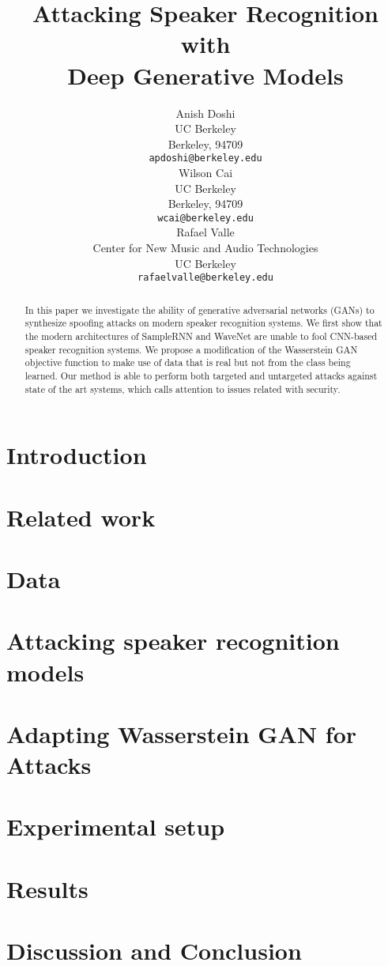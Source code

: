 \documentclass{article}
\title{Attacking Speaker Recognition with \\Deep Generative Models}
\author{
  Anish Doshi \\
  UC Berkeley \\
  Berkeley, 94709 \\
  \texttt{apdoshi@berkeley.edu} \\
  \And
  Wilson Cai\\
  UC Berkeley\\
  Berkeley, 94709 \\
  \texttt{wcai@berkeley.edu} \\
  \And
  Rafael Valle \\
  Center for New Music and Audio Technologies \\
  UC Berkeley \\
  \texttt{rafaelvalle@berkeley.edu} \\
}
\begin{document}

\maketitle

\begin{abstract}
    In this paper we investigate the ability of generative adversarial networks (GANs) to synthesize spoofing attacks on modern speaker recognition systems. We first show that the modern architectures of SampleRNN 
    and WaveNet are unable to fool CNN-based speaker recognition systems. We propose  
    a modification of the Wasserstein GAN objective function to make use of data that is 
    real but not from the class being learned. Our method is able to perform both targeted and untargeted attacks against state of the art systems, which calls attention to issues related with security. 
\end{abstract}

\section{Introduction} \label{sec:introduction}

%
\section{Related work}\label{sec:related_work}

%
\section{Data}\label{sec:data}

%
\section{Attacking speaker recognition models}\label{sec:spk_rec_atks}

%
\section{Adapting Wasserstein GAN for Attacks}\label{sec:wgan}

%
\section{Experimental setup}\label{sec:experiments}
%
\section{Results}\label{sec:results}

%
\section{Discussion and Conclusion}\label{sec:conclusions}

%



\end{document}
